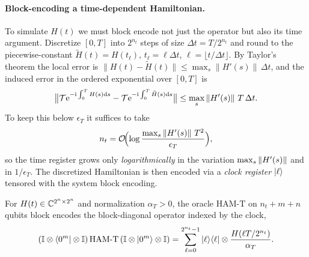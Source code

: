\paragraph{Block-encoding a time-dependent Hamiltonian.}
To simulate $H(t)$ we must block encode not just the operator but also its time argument.
Discretize $[0,T]$ into $2^{n_t}$ steps of size $\Delta t=T/2^{n_t}$ and round to the
piecewise-constant $\tilde H(t)=H(t_\ell)$, $t_\ell=\ell\Delta t$, $\ell=\lfloor
t/\Delta t\rfloor$. By Taylor's theorem the local error is
$\|H(t)-\tilde H(t)\|\le\max_s\|H'(s)\|\,\Delta t$, and the induced error in the ordered
exponential over $[0,T]$ is
\begin{equation}
  \bigl\|\mathcal T\mathrm{e}^{-\mathrm{i}\int_0^TH(s)\mathrm{d} s}
        -\mathcal T\mathrm{e}^{-\mathrm{i}\int_0^T\tilde H(s)\mathrm{d} s}\bigr\|
  \le\max_{s}\left\lVert H'(s) \right\rVert\,T\,\Delta t.
  \label{eq:lec12-disc-error}
\end{equation}
To keep this below $\epsilon_T$ it suffices to take
\begin{equation}
  n_t=\mathcal{O}\!\Bigl(\log\frac{\max_s\left\lVert H'(s) \right\rVert\,T^2}{\epsilon_T}\Bigr),
  \label{eq:lec12-nt}
\end{equation}
so the time register grows only \emph{logarithmically} in the variation
$\max_s\left\lVert H'(s) \right\rVert$ and in $1/\epsilon_T$. The discretized Hamiltonian is then encoded via
a \emph{clock register} $\ket\ell$ tensored with the system block encoding.

\begin{definition}
\label{def:lec12-hamt}
For $H(t)\in\mathbb{C}^{2^n\times2^n}$ and normalization $\alpha_T>0$, the oracle
$\mathrm{HAM\text{-}T}$ on $n_t+m+n$ qubits block encodes the block-diagonal operator
indexed by the clock,
\begin{equation}
  (\mathbb{I}\otimes\bra{0^m}\otimes\mathbb{I})\,\mathrm{HAM\text{-}T}\,
   (\mathbb{I}\otimes\ket{0^m}\otimes\mathbb{I})
  =\sum_{\ell=0}^{2^{n_t}-1}\ket{\ell}\!\bra{\ell}\otimes\frac{H(\ell T/2^{n_t})}{\alpha_T}.
  \label{eq:lec12-hamt}
\end{equation}
\end{definition}

